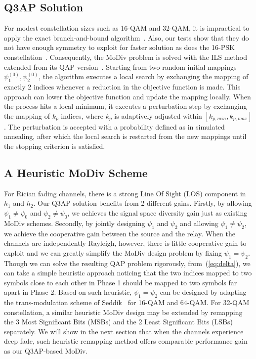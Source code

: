 \documentclass[journal,draftcls,onecolumn,12pt,twoside]{IEEEtran}
\begin{document}
\subsection{Q3AP Solution}
For modest constellation sizes such as 16-QAM and 32-QAM, it is impractical
to apply the exact branch-and-bound algorithm~\cite{hahn2008quadratic}. Also,
our tests show that they do not have enough symmetry to exploit for faster
solution as does the 16-PSK constellation~\cite{mittelmann2015solving}.
Consequently, the MoDiv problem is solved with the ILS
method~\cite{hahn2008quadratic} extended from its QAP
version~\cite{stutzle2006iterated}. Starting from two random initial mappings
$\psi_1^{(0)}, \psi_2^{(0)}$, the algorithm executes a local search by
exchanging the mapping of exactly 2 indices whenever a reduction in the
objective function is made. This approach can lower the objective function and
update the mapping locally. When the process hits a local minimum, it executes a
perturbation step by exchanging the mapping of $k_p$ indices, where $k_p$ is
adaptively adjusted within $[k_{p,min}, k_{p,max}]$. The perturbation is
accepted with a probability defined as in simulated annealing, after which the
local search is restarted from the new mappings until the stopping criterion is
satisfied.

\subsection{A Heuristic MoDiv Scheme}
\label{sec:heuristic}
For Rician fading channels, there is a strong Line Of Sight (LOS) component in
$h_1$ and $h_2$. Our Q3AP solution benefits from 2 different gains. Firstly, by
allowing $\psi_1\not=\psi_0$ and $\psi_2\not=\psi_0$, we achieves the signal
space diversity gain just as existing MoDiv schemes. Secondly, by jointly
designing $\psi_1$ and $\psi_2$ and allowing $\psi_1\not=\psi_2$, we achieve the
cooperative gain between the source and the relay. When the channels are
independently Rayleigh, however, there is little cooperative gain to exploit and
we can greatly simplify the MoDiv design problem by fixing $\psi_1=\psi_2$.
Though we can solve the resulting QAP problem rigorously, from~(\ref{eq:delta}),
we can take a simple heuristic approach noticing that the two indices mapped to
two symbols close to each other in Phase 1 should be mapped to two symbols far
apart in Phase 2. Based on such heuristic, $\psi_1=\psi_2$ can be designed by
adapting the trans-modulation scheme of Seddik~\cite{seddik2008trans} for 16-QAM
and 64-QAM. For 32-QAM constellation, a similar heuristic MoDiv design may be
extended by remapping the 3 Most Significant Bits (MSBs) and the 2 Least
Significant Bits (LSBs) separately. We will show in the next section that when
the channels experience deep fade, such heuristic remapping method offers
comparable performance gain as our Q3AP-based MoDiv.
\end{document}

